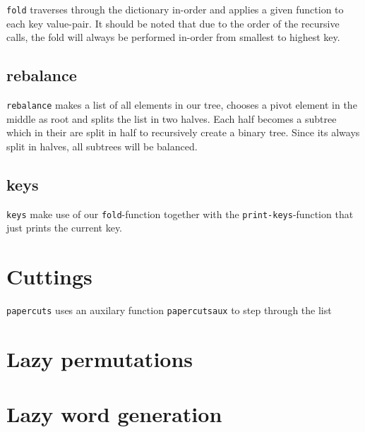 \documentclass[a4paper,11pt]{article}
\begin{document}
\texttt{fold} traverses through the dictionary in-order and applies a given function to each key value-pair. It should be noted that due to the order of the recursive calls, the fold will always be performed in-order from smallest to highest key.

\subsection{rebalance}

\texttt{rebalance} makes a list of all elements in our tree, chooses a pivot element in the middle as root and splits the list in two halves. Each half becomes a subtree which in their are split in half to recursively create a binary tree. Since its always split in halves, all subtrees will be balanced.

\subsection{keys}

\texttt{keys} make use of our \texttt{fold}-function together with the \texttt{print-keys}-function that just prints the current key.

\section{Cuttings}

\texttt{papercuts} uses an auxilary function \texttt{papercutsaux} to step through the list

\section{Lazy permutations}

\section{Lazy word generation}
\end{document}
